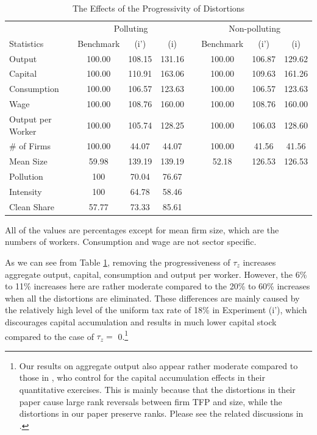 \documentclass[AEJ]{AEA}
\begin{document}
\begin{table}[t]
\footnotesize
\centering
\caption{The Effects of the Progressivity of Distortions}
\begin{tabular}{lccccccc}
    \hline \hline
                         & \multicolumn{3}{c}{Polluting}    & & \multicolumn{3}{c}{Non-polluting} \\
    \cmidrule{2-4} \cmidrule{6-8}
    Statistics           & Benchmark & (i')      & (i)      & & Benchmark     & (i')    & (i) \\
    \hline
    Output               & 100.00    & 108.15   & 131.16    & & 100.00        & 106.87 & 129.62 \\
    Capital              & 100.00    & 110.91   & 163.06    & & 100.00        & 109.63 & 161.26 \\
    Consumption          & 100.00    & 106.57   & 123.63    & & 100.00        & 106.57 & 123.63 \\
    Wage                 & 100.00    & 108.76   & 160.00    & & 100.00        & 108.76 & 160.00 \\
    Output per Worker    & 100.00    & 105.74   & 128.25    & & 100.00        & 106.03 & 128.60 \\
    \hline
    \# of Firms          & 100.00    & 44.07    &44.07      & & 100.00        & 41.56  & 41.56 \\
    Mean Size            & 59.98     & 139.19   & 139.19    & & 52.18         & 126.53 & 126.53 \\
    \hline
    Pollution            & 100       & 70.04    & 76.67     \\
    Intensity            & 100       & 64.78    & 58.46     \\
    Clean Share          & 57.77     & 73.33    & 85.61     \\
    \hline
\end{tabular}
\begin{tablenotes}
     All of the values are percentages except for mean firm size, which are the numbers of workers. Consumption and wage are not sector specific.
\end{tablenotes}
\label{tab:uniform}
\end{table}

As we can see from Table \ref{tab:uniform}, removing the progressiveness of $\tau_z$ increases aggregate output, capital, consumption and output per worker. However, the 6\% to 11\% increases here are rather moderate compared to the 20\% to 60\% increases when all the distortions are eliminated. These differences are mainly caused by the relatively high level of the uniform tax rate of 18\% in Experiment (i'), which discourages capital accumulation and results in much lower capital stock compared to the case of $\tau_z =$ 0.\footnote{Our results on aggregate output also appear rather moderate compared to those in \citet{RestucciaRogerson:2008}, who control for the capital accumulation effects in their quantitative exercises. This is mainly because that the distortions in their paper cause large rank reversals between firm TFP and size, while the distortions in our paper preserve ranks. Please see the related discussions in \citet{Hopenhayn:2014}.}
\end{document}
